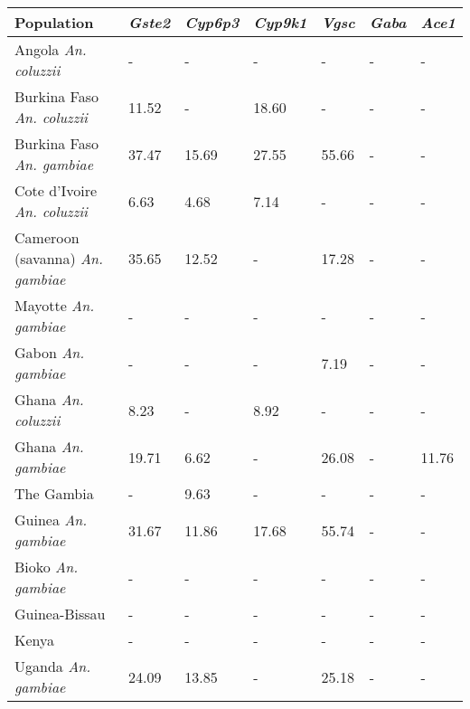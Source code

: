 \begin{tabular}{lllllll}
\toprule
                              Population & \textit{Gste2} & \textit{Cyp6p3} & \textit{Cyp9k1} & \textit{Vgsc} & \textit{Gaba} & \textit{Ace1} \\
\midrule
            Angola \textit{An. coluzzii} &              - &               - &               - &             - &             - &             - \\
      Burkina Faso \textit{An. coluzzii} &          11.52 &               - &           18.60 &             - &             - &             - \\
       Burkina Faso \textit{An. gambiae} &          37.47 &           15.69 &           27.55 &         55.66 &             - &             - \\
     Cote d'Ivoire \textit{An. coluzzii} &           6.63 &            4.68 &            7.14 &             - &             - &             - \\
 Cameroon (savanna) \textit{An. gambiae} &          35.65 &           12.52 &               - &         17.28 &             - &             - \\
            Mayotte \textit{An. gambiae} &              - &               - &               - &             - &             - &             - \\
              Gabon \textit{An. gambiae} &              - &               - &               - &          7.19 &             - &             - \\
             Ghana \textit{An. coluzzii} &           8.23 &               - &            8.92 &             - &             - &             - \\
              Ghana \textit{An. gambiae} &          19.71 &            6.62 &               - &         26.08 &             - &         11.76 \\
                              The Gambia &              - &            9.63 &               - &             - &             - &             - \\
             Guinea \textit{An. gambiae} &          31.67 &           11.86 &           17.68 &         55.74 &             - &             - \\
              Bioko \textit{An. gambiae} &              - &               - &               - &             - &             - &             - \\
                           Guinea-Bissau &              - &               - &               - &             - &             - &             - \\
                                   Kenya &              - &               - &               - &             - &             - &             - \\
             Uganda \textit{An. gambiae} &          24.09 &           13.85 &               - &         25.18 &             - &             - \\
\bottomrule
\end{tabular}
